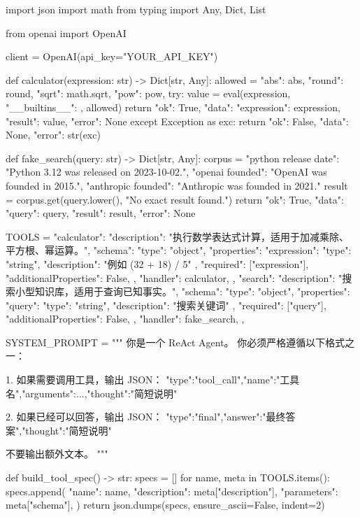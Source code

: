 \begin{codeblock}
import json
import math
from typing import Any, Dict, List

from openai import OpenAI


client = OpenAI(api_key="YOUR_API_KEY")


def calculator(expression: str) -> Dict[str, Any]:
    allowed = {
        "abs": abs,
        "round": round,
        "sqrt": math.sqrt,
        "pow": pow,
    }
    try:
        value = eval(expression, {"__builtins__": {}}, allowed)
        return {"ok": True, "data": {"expression": expression, "result": value}, "error": None}
    except Exception as exc:
        return {"ok": False, "data": None, "error": str(exc)}


def fake_search(query: str) -> Dict[str, Any]:
    corpus = {
        "python release date": "Python 3.12 was released on 2023-10-02.",
        "openai founded": "OpenAI was founded in 2015.",
        "anthropic founded": "Anthropic was founded in 2021."
    }
    result = corpus.get(query.lower(), "No exact result found.")
    return {"ok": True, "data": {"query": query, "result": result}, "error": None}


TOOLS = {
    "calculator": {
        "description": "执行数学表达式计算，适用于加减乘除、平方根、幂运算。",
        "schema": {
            "type": "object",
            "properties": {
                "expression": {"type": "string", "description": "例如 (32 + 18) / 5"}
            },
            "required": ["expression"],
            "additionalProperties": False,
        },
        "handler": calculator,
    },
    "search": {
        "description": "搜索小型知识库，适用于查询已知事实。",
        "schema": {
            "type": "object",
            "properties": {
                "query": {"type": "string", "description": "搜索关键词"}
            },
            "required": ["query"],
            "additionalProperties": False,
        },
        "handler": fake_search,
    },
}


SYSTEM_PROMPT = """
你是一个 ReAct Agent。
你必须严格遵循以下格式之一：

1. 如果需要调用工具，输出 JSON：
{"type":"tool_call","name":"工具名","arguments":{...},"thought":"简短说明"}

2. 如果已经可以回答，输出 JSON：
{"type":"final","answer":"最终答案","thought":"简短说明"}

不要输出额外文本。
"""


def build_tool_spec() -> str:
    specs = []
    for name, meta in TOOLS.items():
        specs.append({
            "name": name,
            "description": meta["description"],
            "parameters": meta["schema"],
        })
    return json.dumps(specs, ensure_ascii=False, indent=2)



\end{codeblock}
